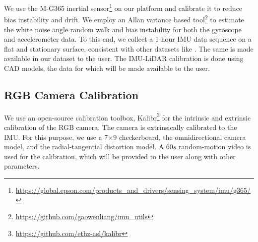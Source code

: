\documentclass[10pt,twocolumn,letterpaper]{article}
\begin{document}

We use the M-G365 inertial sensor\footnote{\href{https://global.epson.com/products\_and\_drivers/sensing\_system/imu/g365/}{https://global.epson.com/products\_and\_drivers/sensing\_system/imu/g365/}} on our platform and calibrate it to reduce bias instability and drift. We employ an Allan variance\cite{4404126} based tool\footnote{\href{https://github.com/gaowenliang/imu\_utils}{https://github.com/gaowenliang/imu\_utils}}
to estimate the white noise angle random walk and bias instability for both the gyroscope and accelerometer data.
To this end, we collect a 1-hour IMU data sequence on a flat and stationary surface, consistent with other datasets like \cite{zhang2021multi}. The same is made available in our dataset to the user. The IMU-LiDAR calibration is done using CAD models, the data for which will be made available to the user.


\subsection{RGB Camera Calibration}

We use an open-source calibration toolbox, Kalibr\footnote{\href{https://github.com/ethz-asl/kalibr}{https://github.com/ethz-asl/kalibr}} for the intrinsic and extrinsic calibration of the RGB camera. The camera is extrinsically calibrated to the IMU. For this purpose, we use a 7$\times$9 checkerboard, the omnidirectional camera model, and the radial-tangential distortion model. A $60s$ random-motion video is used for the calibration, which will be provided to the user along with other parameters.
\end{document}
